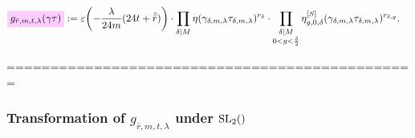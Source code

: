 \documentclass{article}
\begin{document}
\begin{align}
  \defineNotation[g-rbar-m-t-lambda-gamma*tau]{g_{\bar{r},m,t,\lambda}(\gamma\tau)}
  &:=
  \unityPower{-\frac{\lambda}{24m} (24t+\sumdelta{\bar{r}})}
  \cdot
  \divisorprod{M}
  \eta(\gamma_{\delta,m,\lambda}\tau_{\delta,m,\lambda})^{r_\delta}
  \cdot
  \prod_{\substack{\divides{\delta}{M}\\0 < g < \frac{\delta}{2}}}
  \eta_{g,0,\delta}^{[S]}(\gamma_{\delta,m,\lambda}\tau_{\delta,m,\lambda})^{r_{\delta,g}}.
  \label{eq:g_rbar-m-t-lambda}
\end{align}










===============================================


\subsubsection{Transformation of $g_{\bar{r},m,t,\lambda}$ under $\SL2Z$}
\end{document}
